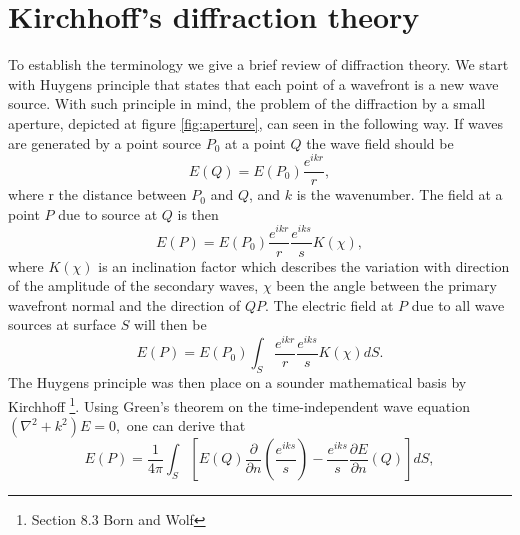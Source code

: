 \documentclass[12pt,twoside,english]{book}
\renewcommand{\~}{\perispomeni}%
\numberwithin{equation}{section}
\numberwithin{figure}{section}
\begin{document}
\section{Kirchhoff's diffraction theory}

\begin{figure}
\begin{minipage}[t]{0.48\textwidth}

\caption{}
\label{fig:aperture}
\end{minipage}
\hfill
\begin{minipage}[t]{0.48\textwidth}

\caption{}
\label{fig:aperture coord}
\end{minipage}
\end{figure}

To establish the terminology we give a brief review of diffraction theory. We start with Huygens principle that states that each point of a wavefront is a new wave source. With such principle in mind, the problem of the diffraction by a small aperture, depicted at figure \ref{fig:aperture}, can seen in the following way. If waves are generated by a point source $P_{0}$ at a point $Q$ the wave field should be
\begin{equation}
E\left(Q\right)=E\left(P_{0}\right)\frac{e^{ikr}}{r},
\label{}
\end{equation}
where r the distance between $P_{0}$ and $Q$, and $k$ is the wavenumber. The field at a point $P$ due to source at $Q$ is then
\begin{equation}
E\left(P\right)=E\left(P_{0}\right)\frac{e^{ikr}}{r}\frac{e^{iks}}{s}K\left(\chi\right),
\end{equation}
where $K\left(\chi\right)$ is an inclination factor which describes the variation with direction of the amplitude of the secondary waves, $\chi$ been the angle between the primary wavefront normal and the direction of $QP$. The electric field at $P$ due to all wave sources at surface $S$ will then be
\begin{equation}
E\left(P\right)=E\left(P_{0}\right)\int_{S}\frac{e^{ikr}}{r}\frac{e^{iks}}{s}K\left(\chi\right)dS.
\label{eq:huygens formula}
\end{equation}
The Huygens principle was then place on a sounder mathematical basis by Kirchhoff \footnote{Section 8.3 Born and Wolf}. Using Green's theorem on the time-independent wave equation $\left(\nabla^{2}+k^{2}\right)E=0,$ one can derive that
\begin{equation}
E\left(P\right)=\frac{1}{4\pi}\int_{S}\left[E\left(Q\right)\frac{\partial}{\partial n}\left(\frac{e^{iks}}{s}\right)-\frac{e^{iks}}{s}\frac{\partial E}{\partial n}\left(Q\right)\right]dS,
\end{equation}
\end{document}
